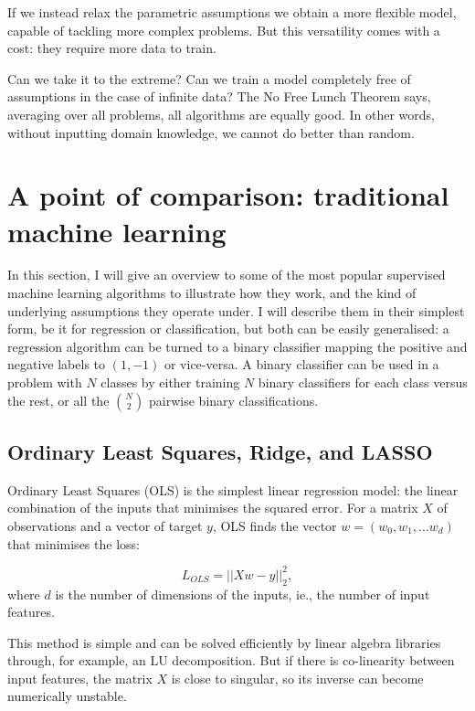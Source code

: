 If we instead relax the parametric assumptions we obtain a more flexible model, capable of tackling more complex problems.
But this versatility comes with a cost: they require more data to train.

\begin{center}
\end{center}


Can we take it to the extreme?
Can we train a model completely free  of assumptions in the case of infinite data? The No Free Lunch Theorem \citep{no_free_lunch} says, averaging over all problems, all algorithms are equally good.
In other words, without inputting domain knowledge, we cannot do better than random.

\section[Traditional machine learning]{A point of comparison: traditional machine learning}
In this section, I will give an overview to some of the most popular supervised machine learning algorithms to illustrate how they work, and the kind of underlying assumptions they operate under.
I will describe them in their simplest form, be it for regression or classification, but both can be easily generalised: a regression algorithm can be turned to a binary classifier mapping the positive and negative labels to $(1, -1)$ or vice-versa.
A binary classifier can be used in a problem with $N$ classes by either training $N$ binary classifiers for each class versus the rest, or all the $\binom{N}{2}$ pairwise binary classifications.

\subsection{Ordinary Least Squares, Ridge, and LASSO}
Ordinary Least Squares (OLS) is the simplest linear regression model: the linear combination of the inputs that minimises the squared error.
For a matrix $X$ of observations and a vector of target $y$, OLS finds the vector $w = (w_0, w_1, ... w_d)$ that minimises the loss:

\begin{equation*}
 L_{OLS} = || X w -y ||_2 ^2,
\end{equation*}
where $d$ is the number of dimensions of the inputs, ie., the number of input features.

This method is simple and can be solved efficiently by linear algebra libraries through, for example, an LU decomposition.
But if there is co-linearity between input features, the matrix $X$ is close to singular, so its inverse can become numerically unstable.

